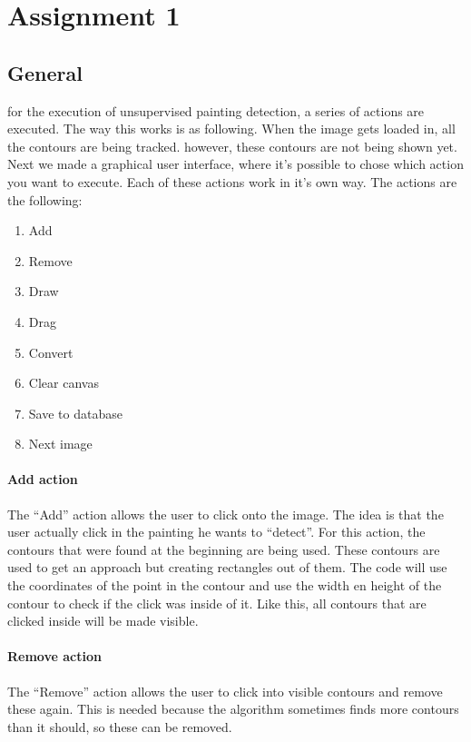 \chapter{Assignment 1}
\label{chap:assignment1}
\section{General}
for the execution of unsupervised painting detection, a series of actions are executed. The way this works is as following. When the image gets loaded in, all the contours are being tracked. however, these contours are not being shown yet. Next we made a graphical user interface, where it's possible to chose which action you want to execute. Each of these actions work in it's own way. The actions are the following: 
\begin{enumerate}
    \item Add
    \item Remove
    \item Draw
    \item Drag
    \item Convert
    \item Clear canvas
    \item Save to database
    \item Next image
\end{enumerate}

\subsubsection{Add action}
The ``Add'' action allows the user to click onto the image. The idea is that the user actually click in the painting he wants to ``detect''. For this action, the contours that were found at the beginning are being used. These contours are used to get an approach but creating rectangles out of them. The code will use the coordinates of the point in the contour and use the width en height of the contour to check if the click was inside of it. Like this, all contours that are clicked inside will be made visible.

\subsubsection{Remove action}
The ``Remove'' action allows the user to click into visible contours and remove these again. This is needed because the algorithm sometimes finds more contours than it should, so these can be removed.

